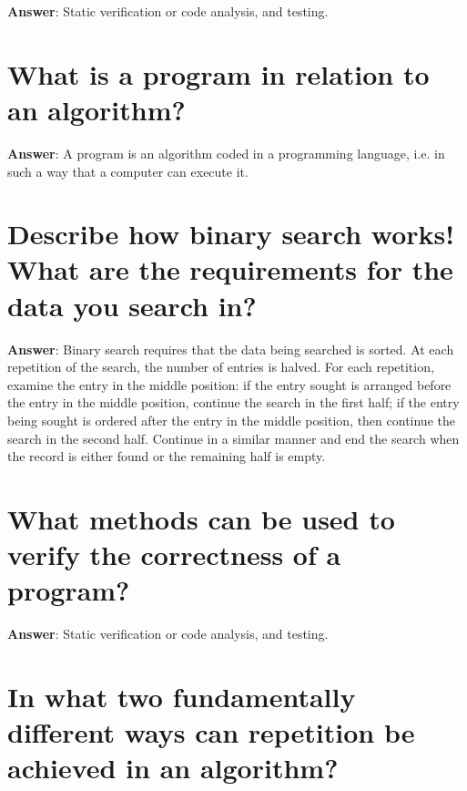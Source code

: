 \documentclass[a4paper,11pt,oneside]{book}
\begin{document}
\begin{sloppypar}
\label{q:178:sa:en:True}

\textbf{Answer}: Static verification or code analysis, and testing.



\section{What is a program in relation to an algorithm?}

\label{q:179:sa:en:True}

\textbf{Answer}: A program is an algorithm coded in a programming language, i.e. in such a way that a computer can execute it.



\section{Describe how binary search works! What are the requirements for the data you search in?}

\label{q:180:sa:en:True}

\textbf{Answer}: Binary search requires that the data being searched is sorted. At each repetition of the search, the number of entries is halved. For each repetition, examine the entry in the middle position: if the entry sought is arranged before the entry in the middle position, continue the search in the first half; if the entry being sought is ordered after the entry in the middle position, then continue the search in the second half. Continue in a similar manner and end the search when the record is either found or the remaining half is empty.



\section{What methods can be used to verify the correctness of a program?}

\label{q:181:sa:en:True}

\textbf{Answer}: Static verification or code analysis, and testing.



\section{In what two fundamentally different ways can repetition be achieved in an algorithm?}

\label{q:182:sa:en:True}


\end{sloppypar}
\end{document}
